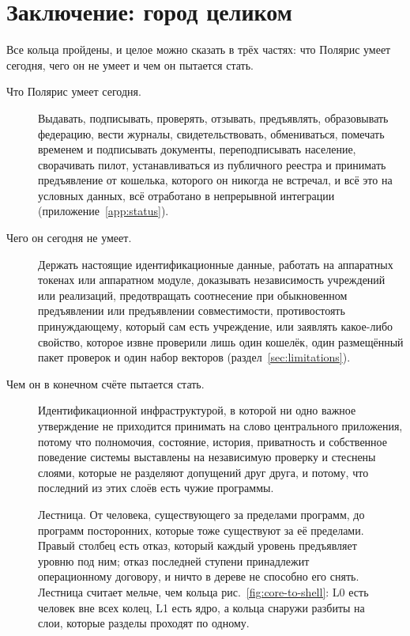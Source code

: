 \section{Заключение: город целиком}
\label{sec:conclusion}

Все кольца пройдены, и целое можно сказать в трёх частях: что Полярис умеет сегодня, чего он не умеет и чем он пытается стать.

\begin{description}
  \item[Что Полярис умеет сегодня.] Выдавать, подписывать, проверять, отзывать, предъявлять,
    образовывать федерацию, вести журналы, свидетельствовать, обмениваться, помечать временем и
    подписывать документы, переподписывать население, сворачивать пилот, устанавливаться из
    публичного реестра и принимать предъявление от кошелька, которого он никогда не встречал, и всё
    это на условных данных, всё отработано в непрерывной интеграции
    (приложение~\ref{app:status}).
  \item[Чего он сегодня не умеет.] Держать настоящие идентификационные данные, работать на
    аппаратных токенах или аппаратном модуле, доказывать независимость учреждений или реализаций,
    предотвращать соотнесение при обыкновенном предъявлении или предъявлении совместимости,
    противостоять принуждающему, который сам есть учреждение, или заявлять какое-либо свойство, которое
    извне проверили лишь один кошелёк, один размещённый пакет проверок и один набор векторов
    (раздел~\ref{sec:limitations}).
  \item[Чем он в конечном счёте пытается стать.] Идентификационной инфраструктурой, в которой ни
    одно важное утверждение не приходится принимать на слово центрального приложения, потому что
    полномочия, состояние, история, приватность и собственное поведение системы выставлены на
    независимую проверку и стеснены слоями, которые не разделяют допущений друг друга, и потому,
    что последний из этих слоёв есть чужие программы.
\end{description}

\begin{figure}[H]\centering
  \caption{Лестница. От человека, существующего за пределами программ, до программ посторонних,
которые тоже существуют за её пределами. Правый столбец есть отказ, который каждый уровень
предъявляет уровню под ним; отказ последней ступени принадлежит операционному договору, и ничто в
дереве не способно его снять. Лестница считает мельче, чем кольца рис.~\ref{fig:core-to-shell}:
L0 есть человек вне всех колец, L1 есть ядро, а кольца снаружи разбиты на слои, которые разделы
проходят по одному.}\label{fig:layer-ladder}\end{figure}

